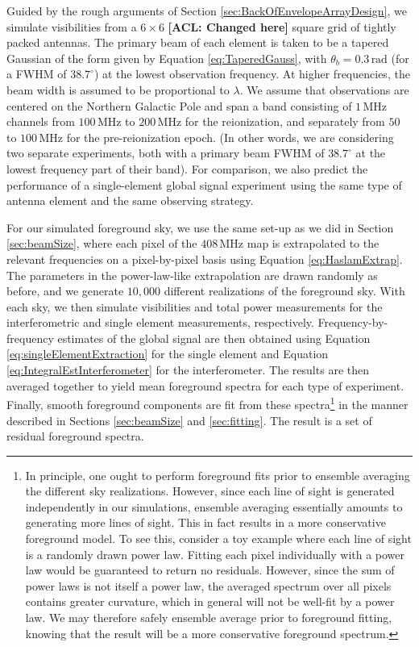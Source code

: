 \documentclass[twocolumn,apj,numberedappendix]{emulateapj}
\newcommand{\acl}[1]{{\color{red} \textbf{[ACL:  #1]}}}
\begin{document}
Guided by the rough arguments of Section \ref{sec:BackOfEnvelopeArrayDesign}, we simulate visibilities from a $6\times6$ \acl{Changed here} square grid of tightly packed antennas. The primary beam of each element is taken to be a tapered Gaussian of the form given by Equation \eqref{eq:TaperedGauss}, with $\theta_b = 0.3\,\textrm{rad}$ (for a FWHM of $38.7^\circ$) at the lowest observation frequency. At higher frequencies, the beam width is assumed to be proportional to $\lambda$. We assume that observations are centered on the Northern Galactic Pole and span a band consisting of $1\,\textrm{MHz}$ channels from $100\,\textrm{MHz}$ to $200\,\textrm{MHz}$ for the reionization, and separately from $50$ to $100\,\textrm{MHz}$ for the pre-reionization epoch. (In other words, we are considering two separate experiments, both with a primary beam FWHM of $38.7^\circ$ at the lowest frequency part of their band). For comparison, we also predict the performance of a single-element global signal experiment using the same type of antenna element and the same observing strategy.

For our simulated foreground sky, we use the same set-up as we did in Section \ref{sec:beamSize}, where each pixel of the $408\,\textrm{MHz}$ map is extrapolated to the relevant frequencies on a pixel-by-pixel basis using Equation \eqref{eq:HaslamExtrap}. The parameters in the power-law-like extrapolation are drawn randomly as before, and we generate $10,000$ different realizations of the foreground sky. With each sky, we then simulate visibilities and total power measurements for the interferometric and single element measurements, respectively. Frequency-by-frequency estimates of the global signal are then obtained using Equation \eqref{eq:singleElementExtraction} for the single element and Equation \eqref{eq:IntegralEstInterferometer} for the interferometer. The results are then averaged together to yield mean foreground spectra for each type of experiment. Finally, smooth foreground components are fit from these spectra\footnote{In principle, one ought to perform foreground fits prior to ensemble averaging the different sky realizations. However, since each line of sight is generated independently in our simulations, ensemble averaging essentially amounts to generating more lines of sight. This in fact results in a more conservative foreground model. To see this, consider a toy example where each line of sight is a randomly drawn power law. Fitting each pixel individually with a power law would be guaranteed to return no residuals. However, since the sum of power laws is not itself a power law, the averaged spectrum over all pixels contains greater curvature, which in general will not be well-fit by a power law. We may therefore safely ensemble average prior to foreground fitting, knowing that the result will be a more conservative foreground spectrum.} in the manner described in Sections \ref{sec:beamSize} and \ref{sec:fitting}. The result is a set of residual foreground spectra.
\end{document}
